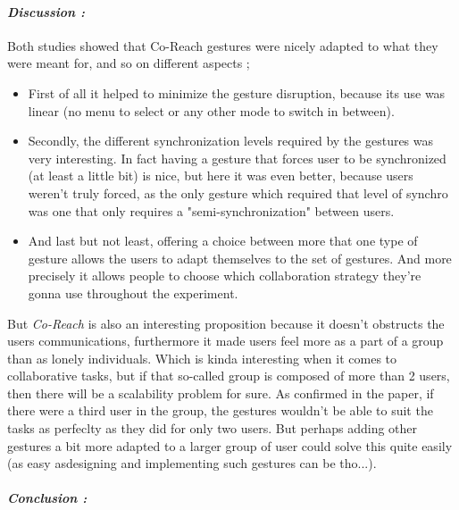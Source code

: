     \paragraph{ \textit{Discussion :}
                \newline }
    \indent \indent Both studies showed that Co-Reach gestures were nicely adapted to what they were meant for, and so on different aspects ;
    \begin{itemize}
        \item First of all it helped to minimize the gesture disruption, because its use was linear (no menu to select or any other mode to switch in between).
        \item Secondly, the different synchronization levels required by the gestures was very interesting. In fact having a gesture that forces user to be synchronized (at least a little bit) is nice, but here it was even better,
            because users weren't truly forced, as the only gesture which required that level of synchro was one that only requires a "semi-synchronization" between users.
        \item And last but not least, offering a choice between more that one type of gesture allows the users to adapt themselves to the set of gestures. And more precisely it allows people to choose which collaboration strategy
            they're gonna use throughout the experiment.
    \end{itemize}
    \indent \indent But \textit{Co-Reach} is also an interesting proposition because it doesn't obstructs the users communications, furthermore it made users feel more as a part of a group than as 
    lonely individuals. Which is kinda interesting when it comes to collaborative tasks, but if that so-called group is composed of more than 2 users, then there will be a scalability problem for sure. 
    \newline
    \indent \indent As confirmed in the paper, if there were a third user in the group, the gestures wouldn't be able to suit the tasks as perfeclty as they did for only two users. But perhaps adding other 
    gestures a bit more adapted to a larger group of user could solve this quite easily (as easy asdesigning and implementing such gestures can be tho...). 

    \paragraph{ \textit{Conclusion :}
                \newline
                \indent \indent \textnormal{} }
    